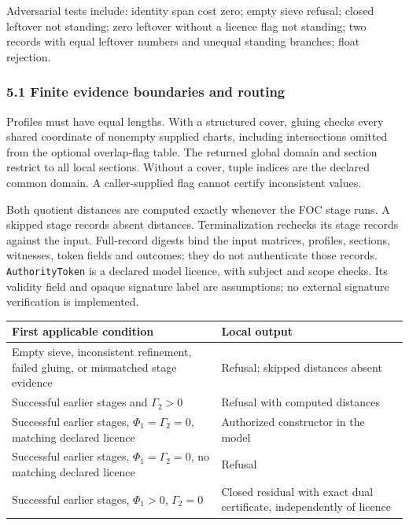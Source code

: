 \documentclass[
  11pt,
]{article}
\begin{document}
Adversarial tests include: identity span cost zero; empty sieve refusal; closed leftover not standing; zero leftover without a licence flag not standing; two records with equal leftover numbers and unequal standing branches; float rejection.

\subsubsection{5.1 Finite evidence boundaries and routing}\label{finite-evidence-boundaries-and-routing}

Profiles must have equal lengths. With a structured cover, gluing checks every shared coordinate of nonempty supplied charts, including intersections omitted from the optional overlap-flag table. The returned global domain and section restrict to all local sections. Without a cover, tuple indices are the declared common domain. A caller-supplied flag cannot certify inconsistent values.

Both quotient distances are computed exactly whenever the FOC stage runs. A skipped stage records absent distances. Terminalization rechecks its stage records against the input. Full-record digests bind the input matrices, profiles, sections, witnesses, token fields and outcomes; they do not authenticate those records. \texttt{AuthorityToken} is a declared model licence, with subject and scope checks. Its validity field and opaque signature label are assumptions; no external signature verification is implemented.

\begin{longtable}[]{@{}
  >{\raggedright\arraybackslash}p{}
  >{\raggedright\arraybackslash}p{}@{}}
\toprule\noalign{}
\begin{minipage}[b]{\linewidth}\raggedright
First applicable condition
\end{minipage} & \begin{minipage}[b]{\linewidth}\raggedright
Local output
\end{minipage} \\
\midrule\noalign{}
\endhead
\bottomrule\noalign{}
\endlastfoot
Empty sieve, inconsistent refinement, failed gluing, or mismatched stage evidence & Refusal; skipped distances absent \\
Successful earlier stages and \(\Gamma_2>0\) & Refusal with computed distances \\
Successful earlier stages, \(\Phi_1=\Gamma_2=0\), matching declared licence & Authorized constructor in the model \\
Successful earlier stages, \(\Phi_1=\Gamma_2=0\), no matching declared licence & Refusal \\
Successful earlier stages, \(\Phi_1>0\), \(\Gamma_2=0\) & Closed residual with exact dual certificate, independently of licence \\
\end{longtable}
\end{document}

